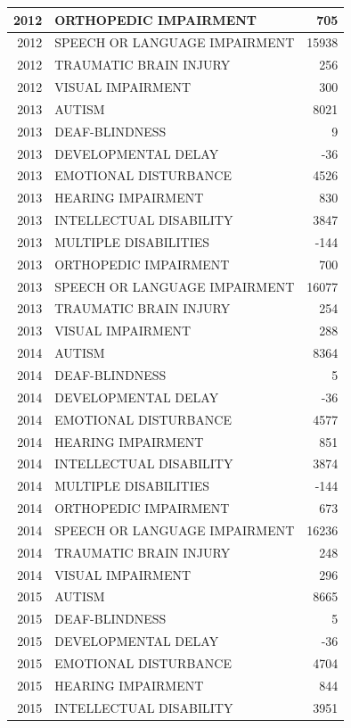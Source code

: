 \documentclass[
  english,
  man]{apa6}
\begin{document}
\begin{tabular}{r|l|r}
\hline
2012 & ORTHOPEDIC IMPAIRMENT & 705\\
\hline
2012 & SPEECH OR LANGUAGE IMPAIRMENT & 15938\\
\hline
2012 & TRAUMATIC BRAIN INJURY & 256\\
\hline
2012 & VISUAL IMPAIRMENT & 300\\
\hline
2013 & AUTISM & 8021\\
\hline
2013 & DEAF-BLINDNESS & 9\\
\hline
2013 & DEVELOPMENTAL DELAY & -36\\
\hline
2013 & EMOTIONAL DISTURBANCE & 4526\\
\hline
2013 & HEARING IMPAIRMENT & 830\\
\hline
2013 & INTELLECTUAL DISABILITY & 3847\\
\hline
2013 & MULTIPLE DISABILITIES & -144\\
\hline
2013 & ORTHOPEDIC IMPAIRMENT & 700\\
\hline
2013 & SPEECH OR LANGUAGE IMPAIRMENT & 16077\\
\hline
2013 & TRAUMATIC BRAIN INJURY & 254\\
\hline
2013 & VISUAL IMPAIRMENT & 288\\
\hline
2014 & AUTISM & 8364\\
\hline
2014 & DEAF-BLINDNESS & 5\\
\hline
2014 & DEVELOPMENTAL DELAY & -36\\
\hline
2014 & EMOTIONAL DISTURBANCE & 4577\\
\hline
2014 & HEARING IMPAIRMENT & 851\\
\hline
2014 & INTELLECTUAL DISABILITY & 3874\\
\hline
2014 & MULTIPLE DISABILITIES & -144\\
\hline
2014 & ORTHOPEDIC IMPAIRMENT & 673\\
\hline
2014 & SPEECH OR LANGUAGE IMPAIRMENT & 16236\\
\hline
2014 & TRAUMATIC BRAIN INJURY & 248\\
\hline
2014 & VISUAL IMPAIRMENT & 296\\
\hline
2015 & AUTISM & 8665\\
\hline
2015 & DEAF-BLINDNESS & 5\\
\hline
2015 & DEVELOPMENTAL DELAY & -36\\
\hline
2015 & EMOTIONAL DISTURBANCE & 4704\\
\hline
2015 & HEARING IMPAIRMENT & 844\\
\hline
2015 & INTELLECTUAL DISABILITY & 3951\\

\end{tabular}
\end{document}
